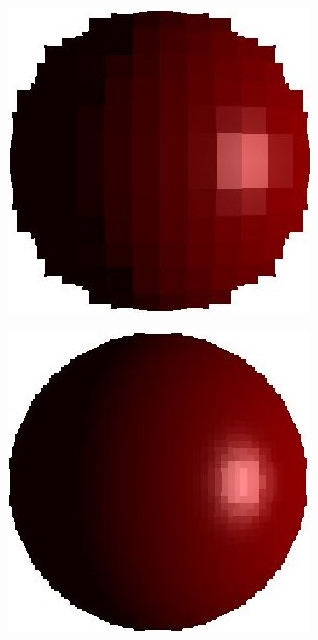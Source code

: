 \documentclass[10pt,a4paper,english, twocolumn]{article}
\begin{document}
\begin{figure}
    \begin{subfigure}{.3\linewidth}
        \centering
        \includegraphics[width=.9\linewidth]{figures/discretized_sdf_32.JPG}
        \caption{}
        \label{sfig:sampled-sphere1}
    \end{subfigure}
    \begin{subfigure}{.3\linewidth}
        \centering
        \includegraphics[width=.9\linewidth]{figures/discretized_sdf_128.JPG}

\end{subfigure}
\end{figure}
\end{document}
